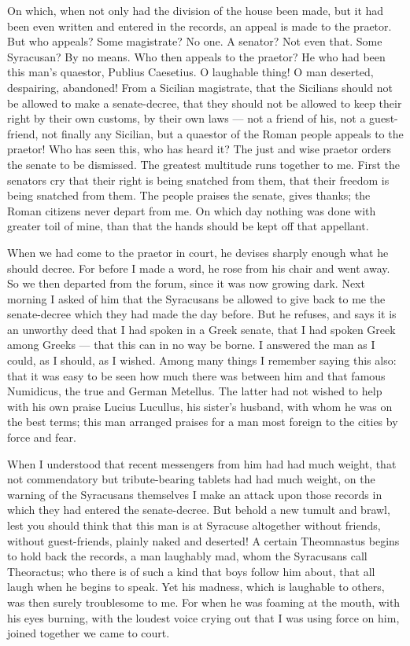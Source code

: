  On which, when not only had the division of the house been made, but it had been even written and entered in the records, an appeal is made to the praetor. But who appeals? Some magistrate? No one. A senator? Not even that. Some Syracusan? By no means. Who then appeals to the praetor? He who had been this man's quaestor, Publius Caesetius. O laughable thing! O man deserted, despairing, abandoned! From a Sicilian magistrate, that the Sicilians should not be allowed to make a senate-decree, that they should not be allowed to keep their right by their own customs, by their own laws --- not a friend of his, not a guest-friend, not finally any Sicilian, but a quaestor of the Roman people appeals to the praetor! Who has seen this, who has heard it? The just and wise praetor orders the senate to be dismissed. The greatest multitude runs together to me. First the senators cry that their right is being snatched from them, that their freedom is being snatched from them. The people praises the senate, gives thanks; the Roman citizens never depart from me. On which day nothing was done with greater toil of mine, than that the hands should be kept off that appellant.

 When we had come to the praetor in court, he devises sharply enough what he should decree. For before I made a word, he rose from his chair and went away. So we then departed from the forum, since it was now growing dark. Next morning I asked of him that the Syracusans be allowed to give back to me the senate-decree which they had made the day before. But he refuses, and says it is an unworthy deed that I had spoken in a Greek senate, that I had spoken Greek among Greeks --- that this can in no way be borne. I answered the man as I could, as I should, as I wished. Among many things I remember saying this also: that it was easy to be seen how much there was between him and that famous Numidicus, the true and German Metellus. The latter had not wished to help with his own praise Lucius Lucullus, his sister's husband, with whom he was on the best terms; this man arranged praises for a man most foreign to the cities by force and fear.

 When I understood that recent messengers from him had had much weight, that not commendatory but tribute-bearing tablets had had much weight, on the warning of the Syracusans themselves I make an attack upon those records in which they had entered the senate-decree. But behold a new tumult and brawl, lest you should think that this man is at Syracuse altogether without friends, without guest-friends, plainly naked and deserted! A certain Theomnastus begins to hold back the records, a man laughably mad, whom the Syracusans call Theoractus; who there is of such a kind that boys follow him about, that all laugh when he begins to speak. Yet his madness, which is laughable to others, was then surely troublesome to me. For when he was foaming at the mouth, with his eyes burning, with the loudest voice crying out that I was using force on him, joined together we came to court.

